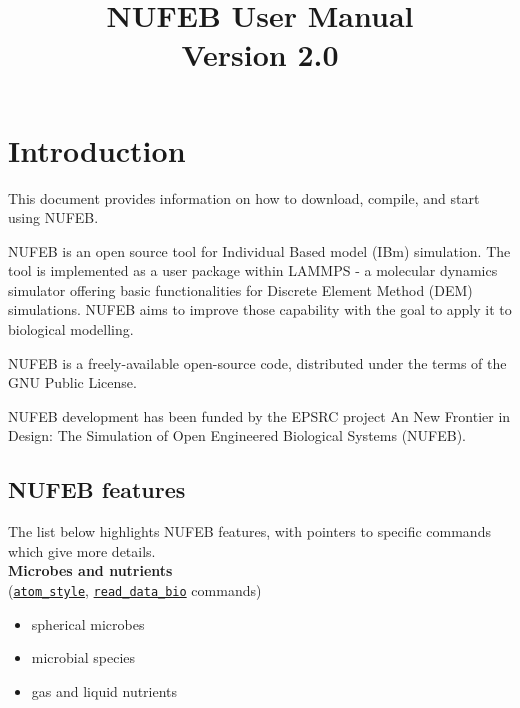 \documentclass[11pt,a4paper,openright]{article}
\begin{document}
%
\title{NUFEB User Manual \\ Version 2.0}

\maketitle



\newpage
\tableofcontents


\cleardoublepage
\setcounter{page}{1}


\section{Introduction}

This document provides information on how to download, compile, and start using NUFEB.

NUFEB is an open source tool for Individual Based model (IBm) simulation. The tool is implemented as a user package within LAMMPS - a molecular dynamics simulator offering basic functionalities for Discrete Element Method (DEM) simulations. NUFEB aims to improve those capability with the goal to apply it to biological modelling.  

NUFEB is a freely-available open-source code, distributed under the terms of the GNU Public License.

NUFEB development has been funded by the EPSRC project An New Frontier in Design: The Simulation of Open Engineered Biological Systems (NUFEB).

\subsection{NUFEB features}
The list below highlights NUFEB features, with pointers to specific commands which give more details. \\

\noindent\textbf{Microbes and nutrients}\\
\noindent(\hyperref[atomstyle]{\tt atom\_style}, \hyperref[readdata]{\tt read\_data\_bio} commands) \\
\begin{itemize} [nosep]
\item spherical microbes 
\item microbial species 
\item gas and liquid nutrients \\
\end{itemize}  
\end{document}
